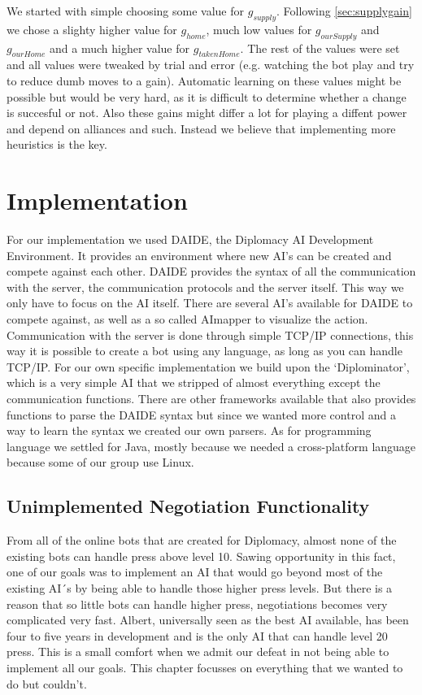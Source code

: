 \documentclass[a4paper]{article} %
\begin{document}
We started with simple choosing some value for $g_{supply}$. Following \autoref{sec:supplygain} we chose a slighty higher value for $g_{home}$, much low values for $g_{ourSupply}$ and $g_{ourHome}$ and a much higher value for $g_{takenHome}$. The rest of the values were set and all values were tweaked by trial and error (e.g. watching the bot play and try to reduce dumb moves to a gain). Automatic learning on these values might be possible but would be very hard, as it is difficult to determine whether a change is succesful or not. Also these gains might differ a lot for playing a diffent power and depend on alliances and such. Instead we believe that implementing more heuristics is the key. 

\section{Implementation}
For our implementation we used DAIDE, the Diplomacy AI Development Environment. It provides an environment where new AI’s can be created and compete against each other. DAIDE provides the syntax of all the communication with the server, the communication protocols and the server itself. This way we only have to focus on the AI itself. 
There are several AI’s available for DAIDE to compete against, as well as a  so called AImapper to visualize the action. Communication with the server is done through simple TCP/IP connections, this way it is possible to create a bot using any language, as long as you can handle TCP/IP. 
For our own specific implementation we build upon the ‘Diplominator’, which is a very simple AI that we stripped of almost everything except the communication functions. There are other frameworks available that also provides functions to parse the DAIDE syntax but since we wanted more control and a way to learn the syntax we created our own parsers. As for programming language we settled for Java, mostly because we needed a cross-platform language because some of our group use Linux. 

\subsection{Unimplemented Negotiation Functionality}

From all of the online bots that are created for Diplomacy, almost none of the existing bots can handle press above level 10. Sawing opportunity in this fact, one of our goals was to implement an AI that would go beyond most of the existing AI´s by being able to handle those higher press levels. But there is a reason that so little bots can handle higher press, negotiations becomes very complicated very fast. Albert, universally seen as the best AI available, has been four to five years in development and is the only AI that can handle level 20 press. This is a small comfort when we admit our defeat in not being able to implement all our goals. This chapter focusses on everything that we wanted to do but couldn't.
\end{document}
